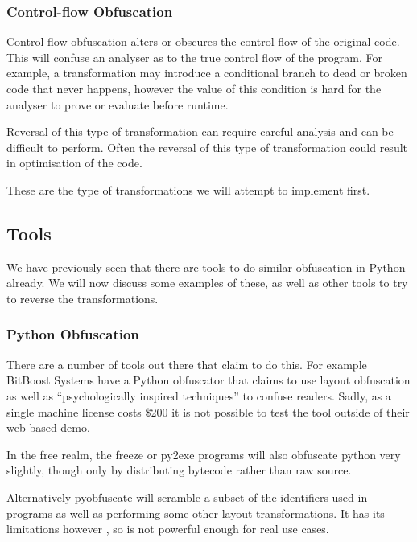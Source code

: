 \documentclass{report}
\begin{document}
\subsubsection{Control-flow Obfuscation}

Control flow obfuscation alters or obscures the control flow of the original code. This will confuse an analyser as to the
true control flow of the program. For example, a transformation may introduce a conditional branch to dead or broken code
that never happens, however the value of this condition is hard for the analyser to prove or evaluate before runtime.

Reversal of this type of transformation can require careful analysis and can be difficult to perform. Often the reversal
of this type of transformation could result in optimisation of the code.

These are the type of transformations we will attempt to implement first.

\subsection{Tools}

We have previously seen that there are tools to do similar obfuscation in Python already. We will now discuss some
examples of these, as well as other tools to try to reverse the transformations.

\subsubsection{Python Obfuscation}

There are a number of tools out there that claim to do this. For example BitBoost Systems have a Python obfuscator \cite{bitboost}
that claims to use layout obfuscation as well as ``psychologically inspired techniques'' to confuse readers. Sadly, as a
single machine license costs \$200 it is not possible to test the tool outside of their web-based demo.

In the free realm, the freeze \cite{freezereadme} or py2exe \cite{py2exe} programs will also obfuscate python very slightly,
though only by distributing bytecode rather than raw source.

Alternatively pyobfuscate \cite{pyobf} will scramble a subset of the identifiers used in programs as well as performing
some other layout transformations. It has its limitations however \cite{pyobf}, so is not powerful enough for real use cases.
\end{document}

